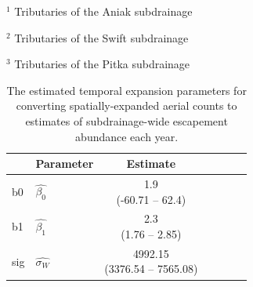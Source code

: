 \documentclass[12pt,]{book}
\theoremstyle{definition}
\theoremstyle{definition}
\theoremstyle{definition}
\theoremstyle{remark}
\begin{document}
\(^1\) Tributaries of the Aniak subdrainage

\(^2\) Tributaries of the Swift subdrainage

\(^3\) Tributaries of the Pitka subdrainage

\begin{table}[H]

\caption{\label{tab:temp-expand-table}The estimated temporal expansion parameters for converting spatially-expanded aerial counts to estimates of subdrainage-wide escapement abundance each year.}
\centering
\begin{tabular}[t]{llcclcc}
\toprule
  & \textbf{Parameter} & \textbf{Estimate}\\
\midrule
b0 & $\hat{\beta_0}$ & \makecell[c]{1.9\\(-60.71 -- 62.4)}\\
b1 & $\hat{\beta_1}$ & \makecell[c]{2.3\\(1.76 -- 2.85)}\\
sig & $\hat{\sigma_W}$ & \makecell[c]{4992.15\\(3376.54 -- 7565.08)}\\
\bottomrule
\end{tabular}
\end{table}

\clearpage
\end{document}

